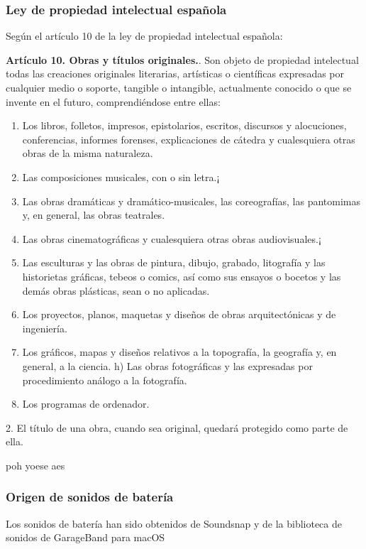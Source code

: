 \documentclass{article}
\begin{document}
\subsubsection{Ley de propiedad intelectual española}
Según el artículo 10 de la ley de propiedad intelectual española:\cite{prop_intelectual}
\begin{displayquote}
\small
\textbf{Artículo 10. Obras y títulos originales.}. Son objeto de propiedad intelectual todas las creaciones originales literarias, artísticas o científicas expresadas
por cualquier medio o soporte, tangible o intangible, actualmente conocido o que se invente en el futuro,
comprendiéndose entre ellas:\newline
\begin{enumerate}[label={\alph*)}]
\item Los libros, folletos, impresos, epistolarios, escritos, discursos y alocuciones, conferencias, informes forenses,
explicaciones de cátedra y cualesquiera otras obras de la misma naturaleza.
\item Las composiciones musicales, con o sin letra.¡
\item Las obras dramáticas y dramático-musicales, las coreografías, las pantomimas y, en general, las obras
teatrales.
\item Las obras cinematográficas y cualesquiera otras obras audiovisuales.¡
\item Las esculturas y las obras de pintura, dibujo, grabado, litografía y las historietas gráficas, tebeos o comics,
así como sus ensayos o bocetos y las demás obras plásticas, sean o no aplicadas.
\item Los proyectos, planos, maquetas y diseños de obras arquitectónicas y de ingeniería.
\item Los gráficos, mapas y diseños relativos a la topografía, la geografía y, en general, a la ciencia.
h) Las obras fotográficas y las expresadas por procedimiento análogo a la fotografía.
\item Los programas de ordenador.
\end{enumerate}
2. El título de una obra, cuando sea original, quedará protegido como parte de ella.
\end{displayquote}

poh yoese aes

\subsubsection{Origen de sonidos de batería}
Los sonidos de batería han sido obtenidos de Soundsnap\cite{soundsnap} y de la biblioteca de sonidos de GarageBand
para macOS\cite{garageband}
\end{document}
